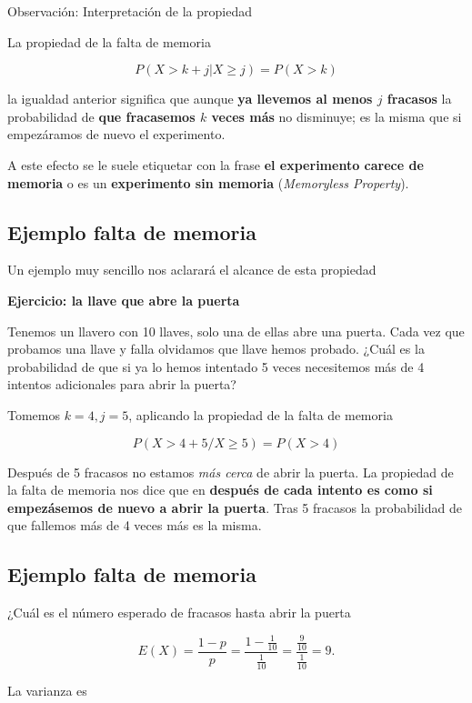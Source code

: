 \documentclass[]{book}
\begin{document}
 Observación: Interpretación de la propiedad

La propiedad de la falta de memoria

\[
P(X> k+j\big|X \geq j)=P(X > k)
\]

la igualdad anterior significa que aunque \textbf{ya llevemos al menos \(j\) fracasos} la probabilidad de \textbf{que fracasemos \(k\) veces más} no disminuye; es la misma que si empezáramos de nuevo el experimento.

A este efecto se le suele etiquetar con la frase \textbf{el experimento carece de memoria} o es un \textbf{experimento sin memoria} (\emph{Memoryless Property}).

\hypertarget{ejemplo-falta-de-memoria}{%
\subsection{Ejemplo falta de memoria}\label{ejemplo-falta-de-memoria}}

Un ejemplo muy sencillo nos aclarará el alcance de esta propiedad

\textbf{Ejercicio: la llave que abre la puerta}

Tenemos un llavero con 10 llaves, solo una de ellas abre una puerta. Cada vez que probamos una llave y falla olvidamos que llave hemos probado. ¿Cuál es la probabilidad de que si ya lo hemos intentado 5 veces necesitemos más de 4 intentos adicionales para abrir la puerta?

Tomemos \(k=4,j=5\), aplicando la propiedad de la falta de memoria

\[
P(X> 4+5/X \geq 5)=P(X > 4)
\]

Después de 5 fracasos no estamos \emph{más cerca} de abrir la puerta.
La propiedad de la falta de memoria nos dice que en \textbf{después de cada intento es como si empezásemos de nuevo a abrir la puerta}. Tras 5 fracasos la probabilidad de que fallemos más de 4 veces más es la misma.

\hypertarget{ejemplo-falta-de-memoria-1}{%
\subsection{Ejemplo falta de memoria}\label{ejemplo-falta-de-memoria-1}}

¿Cuál es el número esperado de fracasos hasta abrir la puerta

\[
E(X)=\frac{1-p}{p}=\frac{1-\frac{1}{10}}{\frac{1}{10}}=\frac{\frac{9}{10}}{\frac{1}{10}}=9.
\]

La varianza es
\end{document}
